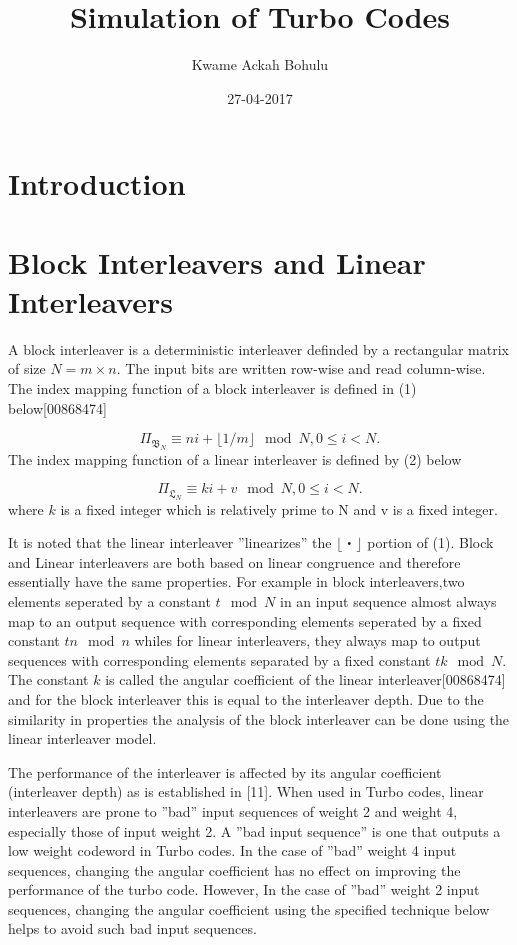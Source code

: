 \documentclass[20 pts]{article}
\title{Simulation of Turbo Codes}
\author{Kwame Ackah Bohulu}
\date{27-04-2017}
\begin{document}
\maketitle


\section{Introduction}


\section{Block Interleavers and Linear Interleavers}
A block interleaver is a deterministic interleaver definded by a rectangular matrix of size $N=m\times n$. The input bits are written row-wise and read column-wise. The index mapping function of a block interleaver is defined in (1) below[00868474]

$$\Pi_{\mathfrak{B}_N} \equiv ni + \lfloor1/m\rfloor \mod {N},		0\leq i < N.$$
The index mapping function of a linear interleaver is defined by (2) below

$$\Pi_{\mathfrak{L}_N} \equiv ki + v \mod {N},		0\leq i < N.$$
where $k$ is a fixed integer which is relatively prime to N and v is a fixed integer.

It is noted that the linear interleaver ''linearizes'' the $\lfloor ・\rfloor$ portion of (1). 
Block and Linear interleavers are both based on linear congruence and therefore essentially have the same properties. For example in block interleavers,two elements seperated by a constant $t\mod {N}$ in an input sequence  almost always map to an output sequence with corresponding elements seperated by a fixed constant $tn\mod{n}$ whiles for linear interleavers, they always map to output sequences with corresponding elements separated by a fixed constant $tk\mod{N}$. The constant $k$ is called the angular coefficient of the linear interleaver[00868474] and for the block interleaver this is equal to the interleaver depth. Due to the similarity in properties the analysis of the block interleaver can be done using the linear interleaver model.

The performance of the interleaver is affected by its angular coefficient (interleaver depth) as is established in [11]. When used in Turbo codes, linear interleavers are prone to ''bad'' input sequences of weight 2 and weight 4, especially those of input weight 2. A ''bad input sequence'' is one that outputs  a low weight codeword in Turbo codes. In the case of ''bad'' weight 4 input sequences, changing the angular coefficient has no effect on improving the performance of the turbo code. However, In the case of ''bad'' weight 2 input sequences, changing the angular coefficient using the specified technique below helps to avoid such bad input sequences.
\end{document}
